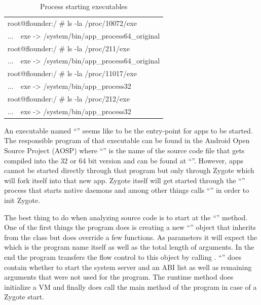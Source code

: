 \begin{table}[htb]
  \caption[Process Executables]{Process starting executables}
  \label{tab:process_executables}
  \centering
  \begin{tabular}{l l}
    \toprule
    \multicolumn{2}{l}{root@flounder:/ \# ls -la /proc/10072/exe} \\
    ... & exe -> /system/bin/app\_process64\_original\\
    \midrule
    \multicolumn{2}{l}{root@flounder:/ \# ls -la /proc/211/exe} \\
    ... & exe -> /system/bin/app\_process64\_original\\
    \midrule
    \multicolumn{2}{l}{root@flounder:/ \# ls -la /proc/11017/exe} \\
    ... & exe -> /system/bin/app\_process32\\
    \midrule
    \multicolumn{2}{l}{root@flounder:/ \# ls -la /proc/212/exe} \\
    ... & exe -> /system/bin/app\_process32\\
    \bottomrule
  \end{tabular}
\end{table}

An executable named ``'' seems like to be the entry-point for apps to be started. The responsible program of that executable
can be found in the Android Open Source Project (AOSP) where
``'' is the name of the source code file that gets
compiled into the 32 or 64 bit version
and can be found at ``''.
However, apps cannot be started directly through that program but
only through Zygote which will fork itself into that new app. Zygote
itself will get started through the ``'' process that starts
native daemons and among other things calls ``''
in order to init Zygote.

The best thing to do when analyzing source code is to start at the
``'' method. One of the first things the program does is
creating a new ``'' object that inherits from the
 class but does override a few functions. As parameters it will expect the 
which is the program name itself as well as the total length of arguments.
In the end the program transfers the flow control to this object by calling
.
``'' does contain whether to start the system server and an ABI
list as well as remaining arguments that were not used for the  program. The runtime  method does initialize
a VM and finally does call the main method of the 
program in case of a Zygote start.

